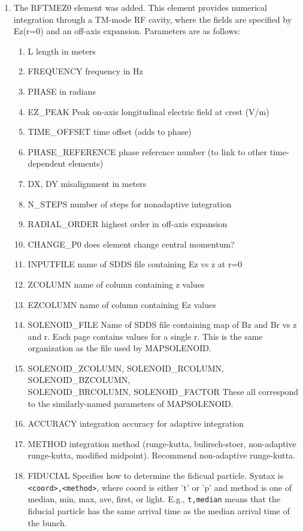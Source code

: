 \begin{enumerate}
\item The RFTMEZ0 element was added.  This element provides numerical integration
through a TM-mode RF cavity, where the fields are specified by Ez(r=0) and an
off-axis expansion.  Parameters are as follows:
\begin{enumerate}
\item L               length in meters
\item FREQUENCY       frequency in Hz
\item PHASE           in radians
\item EZ\_PEAK         Peak on-axis longitudinal electric field at crest (V/m)
\item TIME\_OFFSET     time offset (adds to phase)
\item PHASE\_REFERENCE phase reference number (to link to other time-dependent elements)
\item DX, DY          misalignment in meters
\item N\_STEPS         number of steps for nonadaptive integration
\item RADIAL\_ORDER    highest order in off-axis expansion
\item CHANGE\_P0       does element change central momentum?
\item INPUTFILE       name of SDDS file containing Ez vs z at r=0
\item ZCOLUMN         name of column containing z values
\item EZCOLUMN        name of column containing Ez values
\item SOLENOID\_FILE   Name of SDDS file containing map of Bz and Br vs z and r.  
                Each page contains values for a single r.  This is the same
                organization as the file used by MAPSOLENOID.
\item SOLENOID\_ZCOLUMN, SOLENOID\_RCOLUMN, SOLENOID\_BZCOLUMN, \\
SOLENOID\_BRCOLUMN, SOLENOID\_FACTOR
                These all correspond to the similarly-named parameters of
                MAPSOLENOID.
\item ACCURACY        integration accuracy for adaptive integration
\item METHOD          integration method (runge-kutta, bulirsch-stoer, non-adaptive 
                runge-kutta, modified midpoint).  Recommend non-adaptive runge-kutta.
\item FIDUCIAL  Specifies how to determine the fidicual particle.  Syntax is
                \verb|<coord>,<method>|, where coord is either 't' or 'p'
                and method is one of median, min, max, ave, first, or light.  E.g., 
                \verb|t,median| means
                that the fiducial particle has the same arrival time as the
                       median arrival time of the bunch.
\end{enumerate}


\end{enumerate}
